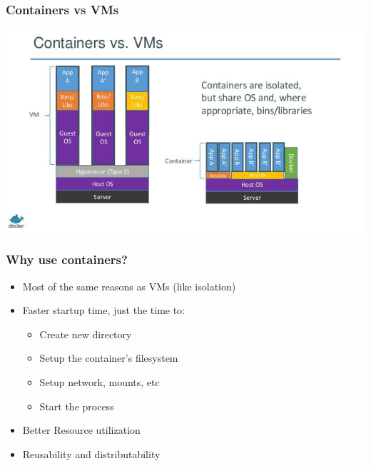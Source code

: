 \documentclass[aspectratio=169,11pt,hyperref={colorlinks=true}]{beamer}
\begin{document}
\begin{frame}
    \frametitle{Containers vs VMs}
    \centering
    \includegraphics[width=.9\textwidth]{containers-vs-vm.jpg}
\end{frame}

\begin{frame}
    \frametitle{Why use containers?}
    \begin{itemize}
        \item Most of the same reasons as VMs (like isolation)
        \item Faster startup time, just the time to:
            \begin{itemize}
                \item Create new directory
                \item Setup the container's filesystem
                \item Setup network, mounts, etc
                \item Start the process
            \end{itemize}
        \item Better Resource utilization
        \item Reusability and distributability
    \end{itemize}
\end{frame}
\end{document}
